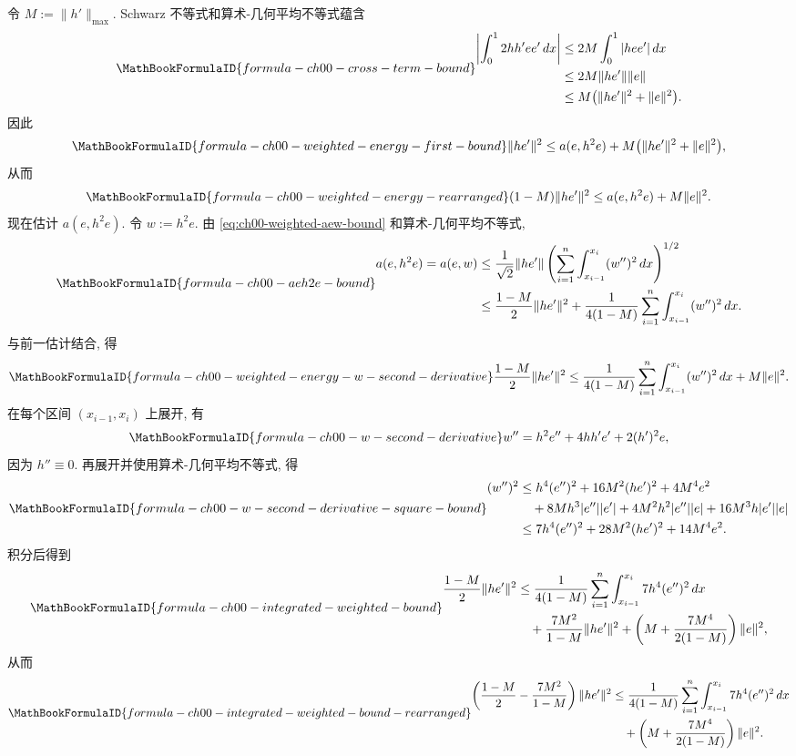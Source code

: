 令 $M:=\|h'\|_{\max}$. Schwarz 不等式和算术-几何平均不等式蕴含
\[
\MathBookFormulaID{formula-ch00-cross-term-bound}
\begin{aligned}
\left|\int_0^12hh'ee'\,dx\right|
&\leq2M\int_0^1|hee'|\,dx\\
&\leq2M\|he'\|\|e\|\\
&\leq M\bigl(\|he'\|^2+\|e\|^2\bigr).
\end{aligned}
\]
因此
\[
\MathBookFormulaID{formula-ch00-weighted-energy-first-bound}
\|he'\|^2\leq a(e,h^2e)+M\bigl(\|he'\|^2+\|e\|^2\bigr),
\]
从而
\[
\MathBookFormulaID{formula-ch00-weighted-energy-rearranged}
(1-M)\|he'\|^2\leq a(e,h^2e)+M\|e\|^2.
\]
现在估计 $a(e,h^2e)$. 令 $w:=h^2e$. 由 \eqref{eq:ch00-weighted-aew-bound} 和算术-几何平均不等式,
\[
\MathBookFormulaID{formula-ch00-aeh2e-bound}
\begin{aligned}
a(e,h^2e)=a(e,w)
&\leq\frac1{\sqrt2}\|he'\|
\left(\sum_{i=1}^n\int_{x_{i-1}}^{x_i}(w'')^2\,dx\right)^{1/2}\\
&\leq\frac{1-M}{2}\|he'\|^2
+\frac1{4(1-M)}\sum_{i=1}^n\int_{x_{i-1}}^{x_i}(w'')^2\,dx.
\end{aligned}
\]
与前一估计结合, 得
\[
\MathBookFormulaID{formula-ch00-weighted-energy-w-second-derivative}
\frac{1-M}{2}\|he'\|^2
\leq\frac1{4(1-M)}\sum_{i=1}^n\int_{x_{i-1}}^{x_i}(w'')^2\,dx
+M\|e\|^2.
\]
在每个区间 $(x_{i-1},x_i)$ 上展开, 有
\[
\MathBookFormulaID{formula-ch00-w-second-derivative}
w''=h^2e''+4hh'e'+2(h')^2e,
\]
因为 $h''\equiv0$. 再展开并使用算术-几何平均不等式, 得
\[
\MathBookFormulaID{formula-ch00-w-second-derivative-square-bound}
\begin{aligned}
(w'')^2
&\leq h^4(e'')^2+16M^2(he')^2+4M^4e^2\\
&\quad+8Mh^3|e''||e'|+4M^2h^2|e''||e|
+16M^3h|e'||e|\\
&\leq7h^4(e'')^2+28M^2(he')^2+14M^4e^2.
\end{aligned}
\]
积分后得到
\[
\MathBookFormulaID{formula-ch00-integrated-weighted-bound}
\begin{aligned}
\frac{1-M}{2}\|he'\|^2
&\leq\frac1{4(1-M)}\sum_{i=1}^n\int_{x_{i-1}}^{x_i}7h^4(e'')^2\,dx\\
&\quad+\frac{7M^2}{1-M}\|he'\|^2
+\left(M+\frac{7M^4}{2(1-M)}\right)\|e\|^2,
\end{aligned}
\]
从而
\[
\MathBookFormulaID{formula-ch00-integrated-weighted-bound-rearranged}
\begin{aligned}
\left(\frac{1-M}{2}-\frac{7M^2}{1-M}\right)\|he'\|^2
&\leq\frac1{4(1-M)}\sum_{i=1}^n\int_{x_{i-1}}^{x_i}7h^4(e'')^2\,dx\\
&\quad+\left(M+\frac{7M^4}{2(1-M)}\right)\|e\|^2.
\end{aligned}
\]
